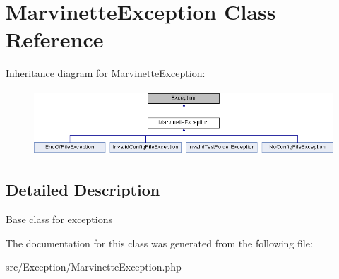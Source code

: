 \hypertarget{classMarvinetteException}{}\section{Marvinette\+Exception Class Reference}
\label{classMarvinetteException}
Inheritance diagram for Marvinette\+Exception\+:\begin{figure}[H]
\begin{center}
\leavevmode
\includegraphics[height=2.441860cm]{classMarvinetteException}
\end{center}
\end{figure}


\subsection{Detailed Description}
Base class for exceptions 

The documentation for this class was generated from the following file\+:\begin{DoxyCompactItemize}
\item 
src/\+Exception/Marvinette\+Exception.\+php\end{DoxyCompactItemize}
